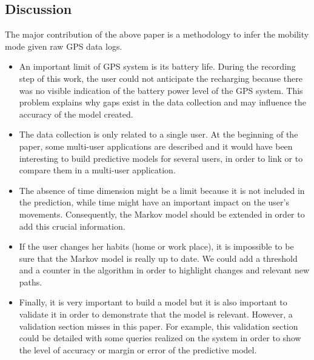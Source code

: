 \subsection{Discussion} \label{lect1-disc}

The major contribution of the above paper is a methodology to infer the mobility mode given raw GPS
data logs.    


\begin{itemize}

\item An important limit of GPS system is its battery life. During the recording step of this work, the user could not anticipate the recharging because there was no visible indication of the battery power level of the GPS system. This problem explains why gaps exist in the data collection and may influence the accuracy of the model created.

\item The data collection is only related to a single user. At the beginning of the paper, some multi-user applications are described and it would have been interesting to build predictive models for several users, in order to link or to compare them in a multi-user application.

\item The absence of time dimension might be a limit because it is not included in the prediction, while time might have an important impact on the user's movements. Consequently, the Markov model should be extended in order to add this crucial information.

\item If the user changes her habits (home or work place), it is impossible to be sure that the Markov model is really up to date. We could add a threshold and a counter in the algorithm in order to highlight changes and relevant new paths.

\item Finally, it is very important to build a model but it is also important to validate it in order to demonstrate that the model is relevant. However, a validation section misses in this paper. For example, this validation section could be detailed with some queries realized on the system in order to show the level of accuracy or margin or error of the predictive model.

\end{itemize}